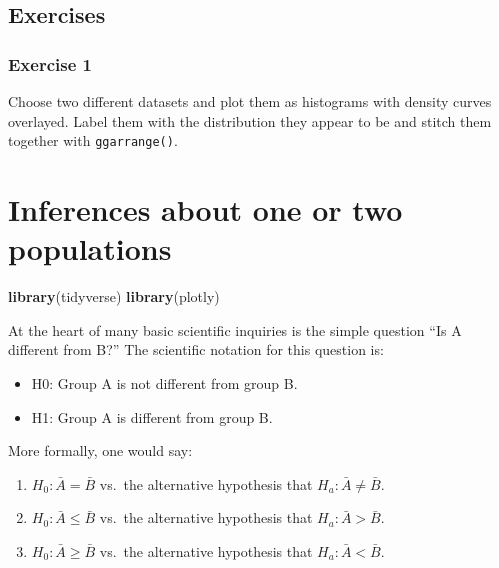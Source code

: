 \documentclass[english,10pt,a4paper,oneside]{book}
\providecommand{\tightlist}{%
  \setlength{\itemsep}{0pt}\setlength{\parskip}{0pt}}
\newenvironment{Shaded}{\begin{snugshade}}{\end{snugshade}}
\newcommand{\KeywordTok}[1]{\textcolor[rgb]{0.13,0.29,0.53}{\textbf{#1}}}
\newcommand{\NormalTok}[1]{#1}
\theoremstyle{definition}
\theoremstyle{definition}
\theoremstyle{definition}
\theoremstyle{remark}
\begin{document}
\section{Exercises}\label{exercises-2}

\subsection{Exercise 1}\label{exercise-1-2}

Choose two different datasets and plot them as histograms with density
curves overlayed. Label them with the distribution they appear to be and
stitch them together with \texttt{ggarrange()}.

\chapter{Inferences about one or two
populations}\label{inferences-about-one-or-two-populations}

\begin{Shaded}
\begin{Highlighting}[]
\KeywordTok{library}\NormalTok{(tidyverse)}
\KeywordTok{library}\NormalTok{(plotly)}
\end{Highlighting}
\end{Shaded}

At the heart of many basic scientific inquiries is the simple question
\enquote{Is A different from B?} The scientific notation for this
question is:

\begin{itemize}
\tightlist
\item
  H0: Group A is not different from group B.
\item
  H1: Group A is different from group B.
\end{itemize}

More formally, one would say:

\begin{enumerate}
\def\labelenumi{\arabic{enumi}.}
\tightlist
\item
  \(H_{0}: \bar{A} = \bar{B}\) vs.~the alternative hypothesis that
  \(H_{a}: \bar{A} \neq \bar{B}\).
\item
  \(H_{0}: \bar{A} \leq \bar{B}\) vs.~the alternative hypothesis that
  \(H_{a}: \bar{A} > \bar{B}\).
\item
  \(H_{0}: \bar{A} \geq \bar{B}\) vs.~the alternative hypothesis that
  \(H_{a}: \bar{A} < \bar{B}\).
\end{enumerate}
\end{document}
